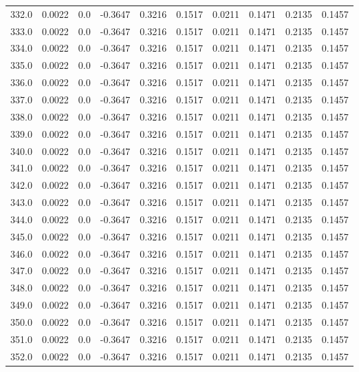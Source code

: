 \begin{longtable}{lrrrrrrrrr}
332.0 & 0.0022 & 0.0 & -0.3647 & 0.3216 & 0.1517 & 0.0211 & 0.1471 & 0.2135 & 0.1457 \\
333.0 & 0.0022 & 0.0 & -0.3647 & 0.3216 & 0.1517 & 0.0211 & 0.1471 & 0.2135 & 0.1457 \\
334.0 & 0.0022 & 0.0 & -0.3647 & 0.3216 & 0.1517 & 0.0211 & 0.1471 & 0.2135 & 0.1457 \\
335.0 & 0.0022 & 0.0 & -0.3647 & 0.3216 & 0.1517 & 0.0211 & 0.1471 & 0.2135 & 0.1457 \\
336.0 & 0.0022 & 0.0 & -0.3647 & 0.3216 & 0.1517 & 0.0211 & 0.1471 & 0.2135 & 0.1457 \\
337.0 & 0.0022 & 0.0 & -0.3647 & 0.3216 & 0.1517 & 0.0211 & 0.1471 & 0.2135 & 0.1457 \\
338.0 & 0.0022 & 0.0 & -0.3647 & 0.3216 & 0.1517 & 0.0211 & 0.1471 & 0.2135 & 0.1457 \\
339.0 & 0.0022 & 0.0 & -0.3647 & 0.3216 & 0.1517 & 0.0211 & 0.1471 & 0.2135 & 0.1457 \\
340.0 & 0.0022 & 0.0 & -0.3647 & 0.3216 & 0.1517 & 0.0211 & 0.1471 & 0.2135 & 0.1457 \\
341.0 & 0.0022 & 0.0 & -0.3647 & 0.3216 & 0.1517 & 0.0211 & 0.1471 & 0.2135 & 0.1457 \\
342.0 & 0.0022 & 0.0 & -0.3647 & 0.3216 & 0.1517 & 0.0211 & 0.1471 & 0.2135 & 0.1457 \\
343.0 & 0.0022 & 0.0 & -0.3647 & 0.3216 & 0.1517 & 0.0211 & 0.1471 & 0.2135 & 0.1457 \\
344.0 & 0.0022 & 0.0 & -0.3647 & 0.3216 & 0.1517 & 0.0211 & 0.1471 & 0.2135 & 0.1457 \\
345.0 & 0.0022 & 0.0 & -0.3647 & 0.3216 & 0.1517 & 0.0211 & 0.1471 & 0.2135 & 0.1457 \\
346.0 & 0.0022 & 0.0 & -0.3647 & 0.3216 & 0.1517 & 0.0211 & 0.1471 & 0.2135 & 0.1457 \\
347.0 & 0.0022 & 0.0 & -0.3647 & 0.3216 & 0.1517 & 0.0211 & 0.1471 & 0.2135 & 0.1457 \\
348.0 & 0.0022 & 0.0 & -0.3647 & 0.3216 & 0.1517 & 0.0211 & 0.1471 & 0.2135 & 0.1457 \\
349.0 & 0.0022 & 0.0 & -0.3647 & 0.3216 & 0.1517 & 0.0211 & 0.1471 & 0.2135 & 0.1457 \\
350.0 & 0.0022 & 0.0 & -0.3647 & 0.3216 & 0.1517 & 0.0211 & 0.1471 & 0.2135 & 0.1457 \\
351.0 & 0.0022 & 0.0 & -0.3647 & 0.3216 & 0.1517 & 0.0211 & 0.1471 & 0.2135 & 0.1457 \\
352.0 & 0.0022 & 0.0 & -0.3647 & 0.3216 & 0.1517 & 0.0211 & 0.1471 & 0.2135 & 0.1457 \\

\end{longtable}
